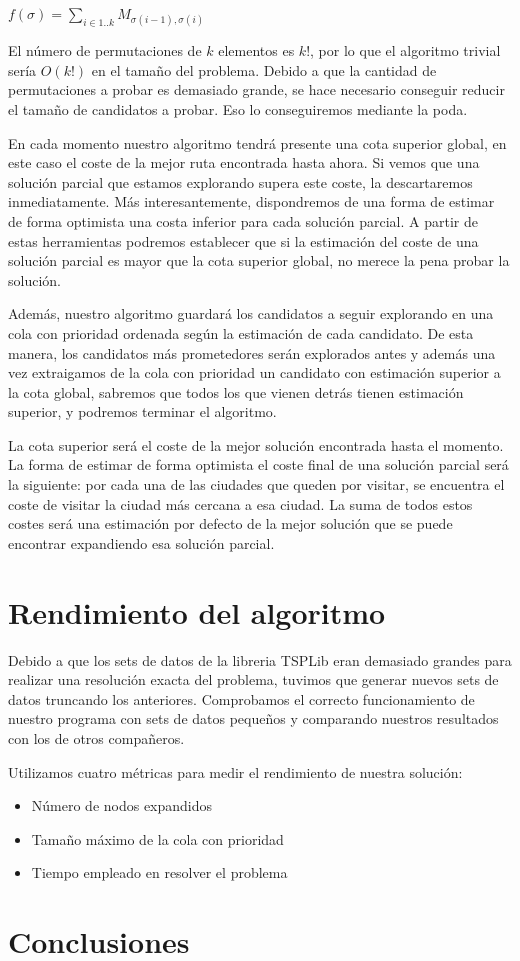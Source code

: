\documentclass[a4paper, 11pt]{article}
\begin{document}
$f(\sigma) = \sum_{i \in 1..k}{M_{\sigma(i - 1), \sigma(i)}}$

El número de permutaciones de $k$ elementos es $k!$, por lo que el algoritmo trivial sería $O(k!)$ en el tamaño del problema. Debido a que la cantidad de permutaciones a probar es demasiado grande, se hace necesario conseguir reducir el tamaño de candidatos a probar. Eso lo conseguiremos mediante la poda.

En cada momento nuestro algoritmo tendrá presente una cota superior global, en este caso el coste de la mejor ruta encontrada hasta ahora. Si vemos que una solución parcial que estamos explorando supera este coste, la descartaremos inmediatamente. Más interesantemente, dispondremos de una forma de estimar de forma optimista una costa inferior para cada solución parcial. A partir de estas herramientas podremos establecer que si la estimación del coste de una solución parcial es mayor que la cota superior global, no merece la pena probar la solución.

Además, nuestro algoritmo guardará los candidatos a seguir explorando en una cola con prioridad ordenada según la estimación de cada candidato. De esta manera, los candidatos más prometedores serán explorados antes y además una vez extraigamos de la cola con prioridad un candidato con estimación superior a la cota global, sabremos que todos los que vienen detrás tienen estimación superior, y podremos terminar el algoritmo.

La cota superior será el coste de la mejor solución encontrada hasta el momento. La forma de estimar de forma optimista el coste final de una solución parcial será la siguiente: por cada una de las ciudades que queden por visitar, se encuentra el coste de visitar la ciudad más cercana a esa ciudad. La suma de todos estos costes será una estimación por defecto de la mejor solución que se puede encontrar expandiendo esa solución parcial.


\section{Rendimiento del algoritmo}
Debido a que los sets de datos de la libreria TSPLib eran demasiado grandes para realizar una resolución exacta del problema, tuvimos que generar nuevos sets de datos truncando los anteriores. Comprobamos el correcto funcionamiento de nuestro programa con sets de datos pequeños y comparando nuestros resultados con los de otros compañeros. 

Utilizamos cuatro métricas para medir el rendimiento de nuestra solución:
\begin{itemize}
  \item Número de nodos expandidos
  \item Tamaño máximo de la cola con prioridad
  \item Tiempo empleado en resolver el problema

\end{itemize}

\section{Conclusiones}
\end{document}
